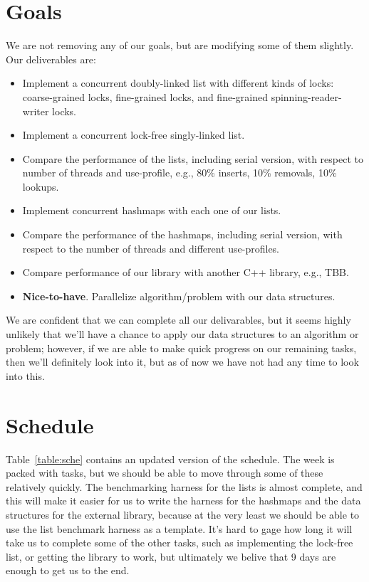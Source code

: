 \documentclass[11pt]{article}
\begin{document}
\section*{Goals}
We are not removing any of our goals, but are modifying some of them slightly.
Our deliverables are:

\begin{itemize}
\item
Implement a concurrent doubly-linked list with different kinds of locks:
coarse-grained locks, fine-grained locks, and fine-grained
spinning-reader-writer locks.
\item %
Implement a concurrent lock-free singly-linked list.
\item
Compare the performance of the lists, including serial version, with respect to
number of threads and use-profile, e.g., 80\% inserts, 10\% removals, 10\%
lookups.
\item
Implement concurrent hashmaps with each one of our lists.
\item
Compare the performance of the hashmaps, including serial version, with respect
to the number of threads and different use-profiles.
\item
Compare performance of our library with another C++ library, e.g., TBB.
\item
{\bf Nice-to-have}. Parallelize algorithm/problem with our data structures.
\end{itemize}

We are confident that we can complete all our delivarables, but it seems highly
unlikely that we'll have a chance to apply our data structures to an algorithm
or problem; however, if we are able to make quick progress on our remaining
tasks, then we'll definitely look into it, but as of now we have not had any
time to look into this.


\section*{Schedule}
Table~\ref{table:sche} contains an updated version of the schedule. The week is
packed with tasks, but we should be able to move through some of these
relatively quickly. The benchmarking harness for the lists is almost complete,
and this will make it easier for us to write the harness for the hashmaps and
the data structures for the external library, because at the very least we
should be able to use the list benchmark harness as a template. It's hard to
gage how long it will take us to complete some of the other tasks, such as
implementing the lock-free list, or getting the library to work, but ultimately
we belive that 9 days are enough to get us to the end.
\end{document}

